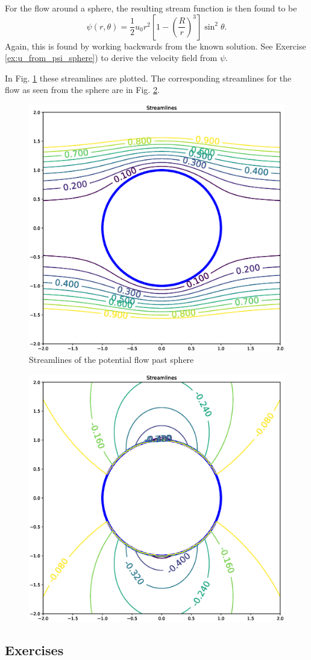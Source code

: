 For the flow around a sphere, the resulting stream function is then
found to be
\begin{equation}
  \label{eq:potential_sphere_stream}
  \psi(r,\theta) = \frac12 u_0 r^2
  \left[
    1 -
    \left(\frac{R}{r}\right)^3
  \right] \sin^2\theta .
\end{equation}
Again, this is found by working backwards from the known solution.
See Exercise \ref{ex:u_from_psi_sphere}) to derive the velocity field
from $\psi$.

In Fig. \ref{fig:potential_streamlines_sphere} these streamlines are
plotted. The corresponding streamlines for the flow as seen from the
sphere are in Fig. \ref{fig:potential_streamlines_moving_sphere}.

\begin{figure}
  \centering
  \includegraphics[width=0.4\linewidth]{figures/potential_flow_past_sphere}
  \caption{\label{fig:potential_streamlines_sphere} Streamlines of
    the potential flow past sphere}
\end{figure}



\begin{figure}
  \centering
  \includegraphics[width=0.4\linewidth]{figures/potential_flow_past_sphere_moving}
  \caption{\label{fig:potential_streamlines_moving_sphere}}
\end{figure}


\subsection{Exercises}

